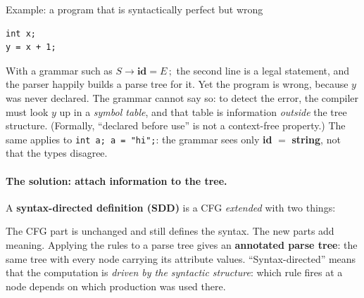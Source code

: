 \documentclass[11pt,a4paper]{article}
\begin{document}
\begin{examplebox}{Example: a program that is syntactically perfect but wrong}
\begin{lstlisting}
int x;
y = x + 1;
\end{lstlisting}
With a grammar such as $S\to\mathbf{id}=E\,;$ the second line is a legal statement, and the parser happily builds a parse tree for it. Yet the program is wrong, because $y$ was never declared. The grammar cannot say so: to detect the error, the compiler must look $y$ up in a \emph{symbol table}, and that table is information \emph{outside} the tree structure. (Formally, ``declared before use'' is not a context-free property.) The same applies to \texttt{int a; a = "hi";}: the grammar sees only \textbf{id} $=$ \textbf{string}, not that the types disagree.
\end{examplebox}

\paragraph{The solution: attach information to the tree.} A \textbf{syntax-directed definition (SDD)} is a CFG \emph{extended} with two things:
\begin{center}
\end{center}
The CFG part is unchanged and still defines the syntax. The new parts add meaning. Applying the rules to a parse tree gives an \textbf{annotated parse tree}: the same tree with every node carrying its attribute values. ``Syntax-directed'' means that the computation is \emph{driven by the syntactic structure}: which rule fires at a node depends on which production was used there.
\end{document}
